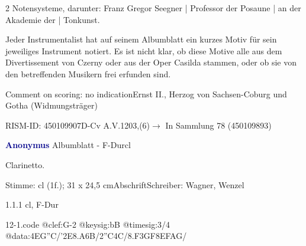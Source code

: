 \documentclass[a4paper, twocolumn, 11pt]{book}
\begin{document}
\newline %
\par 2 Notensysteme, darunter: Franz Gregor Seegner | Professor der Posaune | an der Akademie der | Tonkunst.
\par Jeder Instrumentalist hat auf seinem Albumblatt ein kurzes Motiv für sein jeweiliges Instrument notiert. Es ist nicht klar, ob diese Motive alle aus dem {\textquotedbl}Divertissement{\textquotedbl} von Czerny oder aus der Oper {\textquotedbl}Casilda{\textquotedbl} stammen, oder ob sie von den betreffenden Musikern frei erfunden sind.
\par Comment on scoring: no indication\newline Ernst II., Herzog von Sachsen-Coburg und Gotha  (Widmungsträger)
\par RISM-ID: 450109907\newline D-Cv  A.V.1203,(6)\newline $\rightarrow$ In Sammlung 78 (450109893)
      
\par \vspace{16pt} \textcolor{darkblue}{\textbf{Anonymus  }}\hfillplus{[12]}\newline Albumblatt - F-Dur\newline cl
\par \begin{itshape}[heading:] Clarinetto.\end{itshape} 
\par \textcolor{darkblue}{}  Stimme: cl  (1f.); 31 x 24,5 cm\newline Abschrift\newline Schreiber: Wagner, Wenzel
\par 1.1.1  cl, F-Dur  
\begin{filecontents*}{12-1.code}
@clef:G-2
@keysig:bB
@timesig:3/4
@data:4EG''C/'2E{8.A6B}/2''C4C/{8.F3GF}{8EFAG}/
\end{filecontents*}
\end{document}

